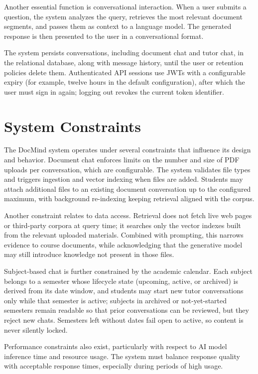 \documentclass[12pt, a4paper, oneside]{report}
\let\oldsection\section
\renewcommand{\section}{%
  \addtocontents{toc}{\protect\needspace{4\baselineskip}}%
  \oldsection
}
\begin{document}
Another essential function is conversational interaction. When a user submits a question, the system analyzes the query, retrieves the most relevant document segments, and passes them as context to a language model. The generated response is then presented to the user in a conversational format.

The system persists conversations, including document chat and tutor chat, in the relational database, along with message history, until the user or retention policies delete them. Authenticated API sessions use JWTs with a configurable expiry (for example, twelve hours in the default configuration), after which the user must sign in again; logging out revokes the current token identifier.

\newpage

\section{System Constraints}

The DocMind system operates under several constraints that influence its design and behavior. Document chat enforces limits on the number and size of PDF uploads per conversation, which are configurable. The system validates file types and triggers ingestion and vector indexing when files are added. Students may attach additional files to an existing document conversation up to the configured maximum, with background re-indexing keeping retrieval aligned with the corpus.

Another constraint relates to data access. Retrieval does not fetch live web pages or third-party corpora at query time; it searches only the vector indexes built from the relevant uploaded materials. Combined with prompting, this narrows evidence to course documents, while acknowledging that the generative model may still introduce knowledge not present in those files.

Subject-based chat is further constrained by the academic calendar. Each subject belongs to a semester whose lifecycle state (upcoming, active, or archived) is derived from its date window, and students may start new tutor conversations only while that semester is active; subjects in archived or not-yet-started semesters remain readable so that prior conversations can be reviewed, but they reject new chats. Semesters left without dates fail open to active, so content is never silently locked.

Performance constraints also exist, particularly with respect to AI model inference time and resource usage. The system must balance response quality with acceptable response times, especially during periods of high usage.
\newpage
\end{document}
